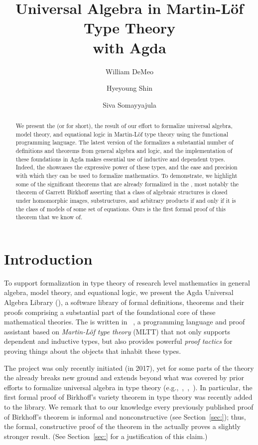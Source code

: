 \documentclass[a4paper,USenglish,cleveref,autoref,thm-restate]{lipics-v2019}
\title{Universal Algebra in Martin-L\"of Type Theory\\ with Agda} %
\author{William DeMeo}{Department of Algebra, Faculty of Mathematics and Physics, Charles University, Czech Republic}{williamdemeo@gmail.com}{https://orcid.org/0000-0003-1832-5690}{}
\author{Hyeyoung Shin}{Faculty of Information Technology, Czech Technical University, Czech Republic}{hyeyoungshinw@gmail.com}{}{}
\author{Siva Somayyajula}{Department of Computer Science, Carnegie Mellon University, USA}{ssomayya@andrew.cmu.edu}{}{}
\begin{document}
\maketitle

\begin{abstract}
We present the \AgdaUALib (or \agdaualib for short), the result of our effort to formalize universal algebra, model theory, and equational logic in Martin-L\"of type theory using the \agda functional programming language.
The latest version of the \agdaualib formalizes a substantial number of definitions and theorems from general algebra and logic, and the implementation of these foundations in Agda makes essential use of inductive and dependent types. Indeed, the \agdaualib showcases the expressive power of these types, and the ease and precision with which they can be used to formalize mathematics.  To demonstrate, we highlight some of the significant theorems that are already formalized in the \agdaualib, most notably the theorem of Garrett Birkhoff asserting that a class of algebraic structures is closed under homomorphic images, substructures, and arbitrary products if and only if it is the class of models of some set of equations. Ours is the first formal proof of this theorem that we know of.
\end{abstract}


\section{Introduction}\label{sec:introduction}
To support formalization in type theory of research level mathematics in general algebra, model theory, and equational logic, we present the Agda Universal Algebra Library (\agdaualib), a software library of formal definitions, theorems and their proofs comprising a substantial part of the foundational core of these mathematical theories.
The \agdaualib is written in \agda~\cite{Norell:2009}, a programming language and proof assistant based on \textit{Martin-L\"of type theory} (MLTT) that not only supports dependent and inductive types, but also provides powerful \emph{proof tactics} for proving things about the objects that inhabit these types.

The project was only recently initiated (in 2017), yet for some parts of the theory the \agdaualib already breaks new ground and extends beyond what was covered by prior efforts to formalize universal algebra in type theory (e.g.,~\cite{Capretta:1999},~\cite{Gunther:2018},~\cite{Spitters:2011}). In particular, the first formal proof of Birkhoff's variety theorem in type theory was recently added to the library. We remark that to our knowledge every previously published proof of Birkhoff's theorem is informal and nonconstructive (see Section~\ref{sec:}); thus, the formal, constructive proof of the theorem in the \agdaualib actually proves a slightly stronger result. (See Section~\ref{sec:} for a justification of this claim.)
\end{document}

